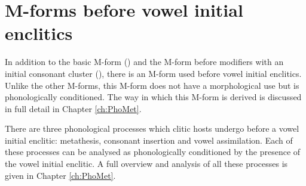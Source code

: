 \section{M-forms before vowel initial enclitics}\label{sec:MforBefEnc}
In addition to the basic M-form (\M) and the M-form
before modifiers with an initial consonant cluster (\Mc),
there is an M-form used before vowel initial enclitics.
Unlike the other M-forms, this M-form does not have a morphological
use but is phonologically conditioned.
The way in which this M-form is derived is discussed
in full detail in Chapter \ref{ch:PhoMet}.

There are three phonological processes which clitic
hosts undergo before a vowel initial enclitic:
metathesis, consonant insertion and vowel assimilation.
Each of these processes can be analysed as
phonologically conditioned by the presence of the vowel initial enclitic.
A full overview and analysis of all these processes
is given in Chapter \ref{ch:PhoMet}.
